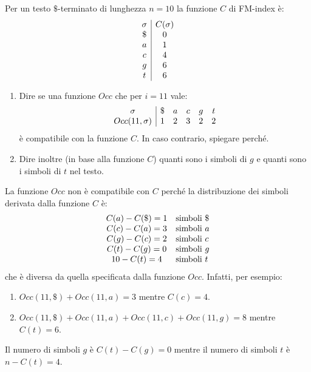 \begin{esempio}
    Per un testo $\$$-terminato di lunghezza $n = 10$ la funzione $C$ di FM-index è:
    \begin{equation}
        \begin{array}{c | c}
            \sigma & C(\sigma) \\
            \$     & 0         \\
            a      & 1         \\
            c      & 4         \\
            g      & 6         \\
            t      & 6         \\
        \end{array}
    \end{equation}
    \begin{enumerate}
        \item Dire se una funzione $Occ$ che per $i = 11$ vale:
              \begin{equation}
                  \begin{array}{c | c c c c c}
                      \sigma          & \$ & a & c & g & t \\
                      Occ(11, \sigma) & 1  & 2 & 3 & 2 & 2 \\
                  \end{array}
              \end{equation}
              è compatibile con la funzione $C$. In caso contrario, spiegare
              perché.
        \item Dire inoltre (in base alla funzione $C$) quanti sono i simboli
              di $g$ e quanti sono i simboli di $t$ nel testo.
    \end{enumerate}

    La funzione $Occ$ non è compatibile con $C$ perché la distribuzione dei simboli
    derivata dalla funzione $C$ è:
    \begin{equation}
        \begin{array}{c l}
            C(a) - C(\$) = 1 & \text{simboli } \$ \\
            C(c) - C(a) = 3  & \text{simboli } a  \\
            C(g) - C(c) = 2  & \text{simboli } c  \\
            C(t) - C(g) = 0  & \text{simboli } g  \\
            10 - C(t) = 4    & \text{simboli } t  \\
        \end{array}
    \end{equation}
    che è diversa da quella specificata dalla funzione $Occ$. Infatti, per esempio:
    \begin{enumerate}
        \item $Occ(11, \$) + Occ(11, a) = 3$ mentre $C(c) = 4$.
        \item $Occ(11, \$) + Occ(11, a) + Occ(11, c) + Occ(11, g) = 8$ mentre
              $C(t) = 6$.
    \end{enumerate}
    Il numero di simboli $g$ è $C(t) - C(g) = 0$ mentre il numero di simboli $t$
    è $n - C(t) = 4$.
\end{esempio}
